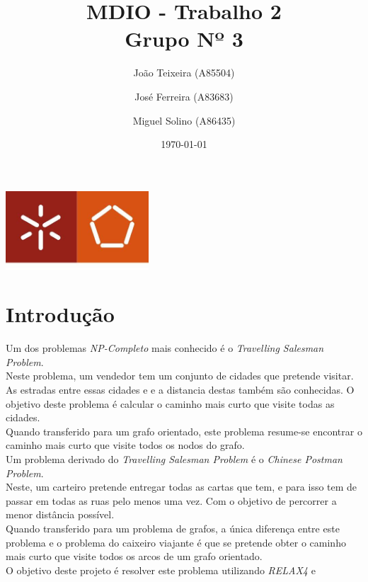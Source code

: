 \documentclass[a4paper]{report}
\begin{document}
\title{MDIO - Trabalho 2\\ 
\large Grupo Nº 3}
\author{João Teixeira (A85504) \and José Ferreira (A83683) \and Miguel Solino (A86435)}
\date{\today}

\begin{center}
    \begin{minipage}{0.75\linewidth}
        \centering
        \includegraphics[width=0.4\textwidth]{images/eng.jpeg}\par\vspace{1cm}
        \vspace{1.5cm}
        \href{https://www.uminho.pt/PT}
        {\color{black}{\scshape\LARGE Universidade do Minho}} \par
        \vspace{1cm}
        \href{https://www.di.uminho.pt/}
        {\color{black}{\scshape\Large Departamento de Informática}} \par
        \vspace{1.5cm}
        \maketitle
    \end{minipage}
\end{center}

\tableofcontents

\pagebreak

\chapter{Introdução}
Um dos problemas \textit{NP-Completo} mais conhecido é o \textit{Travelling
Salesman Problem}. \\
Neste problema, um vendedor tem um conjunto de cidades que pretende visitar. As
estradas entre essas cidades e e a distancia destas também são conhecidas. O
objetivo deste problema é calcular o caminho mais curto que visite todas as
cidades.\\
Quando transferido para um grafo orientado, este problema resume-se
encontrar o caminho mais curto que visite todos os nodos do grafo.\\
Um problema derivado do \textit{Travelling Salesman Problem} é o \textit{Chinese
Postman Problem}.\\
Neste, um carteiro pretende entregar todas as cartas que tem, e para isso tem de
passar em todas as ruas pelo menos uma vez. Com o objetivo de percorrer a menor
distância possível.\\
Quando transferido para um problema de grafos, a única diferença entre este
problema e o problema do caixeiro viajante é que se pretende obter o caminho
mais curto que visite todos os arcos de um grafo orientado. \\
O objetivo deste projeto é resolver este problema utilizando \textit{RELAX4} e 
\end{document}
